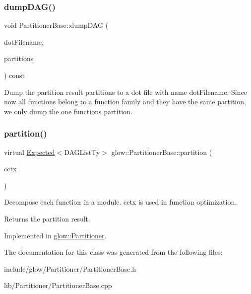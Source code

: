 \subsubsection{\texorpdfstring{dump\+D\+A\+G()}{dumpDAG()}}
{\footnotesize\ttfamily void Partitioner\+Base\+::dump\+D\+AG (\begin{DoxyParamCaption}\item[{llvm\+::\+String\+Ref}]{dot\+Filename,  }\item[{const D\+A\+G\+List\+Ty \&}]{partitions }\end{DoxyParamCaption}) const}

Dump the partition result {\ttfamily partitions} to a dot file with name {\ttfamily dot\+Filename}. Since now all functions belong to a function family and they have the same partition, we only dump the one function\textquotesingle{}s partition. \mbox{\label{classglow_1_1_partitioner_base_ac51c9b3cf875b52d6aa0282aebcc941d}} 
\subsubsection{\texorpdfstring{partition()}{partition()}}
{\footnotesize\ttfamily virtual \hyperlink{classglow_1_1detail_1_1_glow_expected}{Expected}$<$D\+A\+G\+List\+Ty$>$ glow\+::\+Partitioner\+Base\+::partition (\begin{DoxyParamCaption}\item[{\hyperlink{structglow_1_1_compilation_context}{Compilation\+Context} \&}]{cctx }\end{DoxyParamCaption})\hspace{0.3cm}{\ttfamily [pure virtual]}}

Decompose each function in a module. {\ttfamily cctx} is used in function optimization. \begin{DoxyReturn}{Returns}
the partition result. 
\end{DoxyReturn}


Implemented in \hyperlink{classglow_1_1_partitioner_a41d81aa72c7c6105def11a06097166fb}{glow\+::\+Partitioner}.



The documentation for this class was generated from the following files\+:\begin{DoxyCompactItemize}
\item 
include/glow/\+Partitioner/Partitioner\+Base.\+h\item 
lib/\+Partitioner/Partitioner\+Base.\+cpp\end{DoxyCompactItemize}
